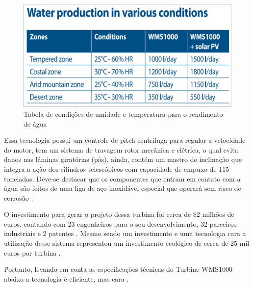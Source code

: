 \begin{figure}[!htbp]
\centering
\includegraphics[scale=0.3]{editaveis/figuras/condicoes}
\caption[Tabela de condições de umidade e temperatura para o rendimento de água]{Tabela de condições de umidade e temperatura para o rendimento de água \footnotemark}
\FloatBarrier
\label{condicoes}
\end{figure}

Essa tecnologia possui um controle de pitch centrífuga para regular a velocidade do motor, tem um sistema de travagem
rotor mecânica e elétrica, o qual evita danos nas lâminas giratórias (pás), ainda, contém um mastro de inclinação que 
integra a ação dos cilindros telescópicos com capacidade de empuxo de 115 toneladas. Deve-se destacar que os componentes 
que entram em contato com a água são feitos de uma liga de aço inoxidável especial que operará sem risco de corrosão 
\cite{eole}.

O investimento para gerar o projeto dessa turbina foi cerca de \$2 milhões de euros, contando com 23 engenheiros para o seu
desenvolvimento, 32 parceiros industriais e 2 patentes \footnotemark. 
Mesmo sendo um investimento e uma tecnologia cara a
utilização desse sistema representou um investimento ecológico de cerca de 25 mil euros por turbina \footnotemark.

Portanto, levando em conta as especificações técnicas do Turbine WMS1000 abaixo a tecnologia é eficiente, mas cara \cite{renewable}.
	
